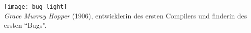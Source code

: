 \texttt{[image: bug-light]}\\
\emph{Grace Murray Hopper} (1906), entwicklerin des ersten Compilers und finderin des ersten ``Bugs''.\\
